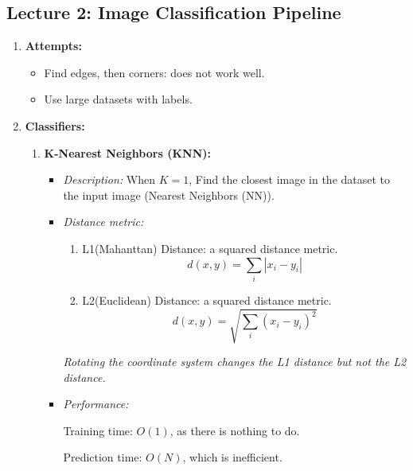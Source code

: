 \documentclass{article}
\begin{document}
\begin{CJK}{UTF8}{gbsn}
\section*{Lecture 2: Image Classification Pipeline}
\begin{enumerate}
    \item \textbf{Attempts:}
    \begin{itemize}
        \item Find edges, then corners: does not work well.
        \item Use large datasets with labels.
    \end{itemize}
    \item \textbf{Classifiers:}
    \begin{enumerate}
        \item \textbf{K-Nearest Neighbors (KNN):}
        \begin{itemize}
            \item \textit{Description:} When \(K = 1\), Find the closest image in the dataset to the input image (Nearest Neighbors (NN)).
            \item \textit{Distance metric:}
            \begin{enumerate} 
                \item L1(Mahanttan) Distance: a squared distance metric.
                \begin{equation}
                    d(x,y) = \sum_i |x_i - y_i|
                \end{equation}
        
                \item L2(Euclidean) Distance: a squared distance metric.
                \begin{equation}
                    d(x,y) = \sqrt{\sum_i (x_i - y_i)^2}
                \end{equation}
            \end{enumerate}
            \textit{Rotating the coordinate system changes the L1 distance but not the L2 distance.}
            
            \item \textit{Performance:}\par
            Training time: \(O(1)\), as there is nothing to do.\par
            Prediction time: \(O(N)\), which is inefficient.
        

\end{itemize}
\end{enumerate}
\end{enumerate}
\end{CJK}
\end{document}
